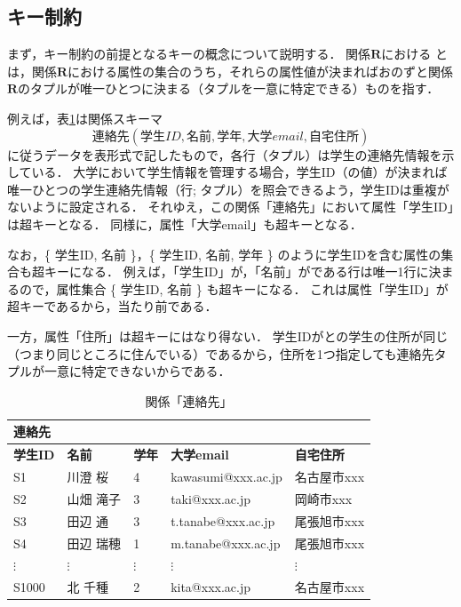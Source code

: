 \subsection{キー制約}
まず，キー制約の前提となるキーの概念について説明する．
関係$\boldsymbol{R}$における とは，関係$\boldsymbol{R}$における属性の集合のうち，それらの属性値が決まればおのずと関係$\boldsymbol{R}$のタプルが唯一ひとつに決まる（タプルを一意に特定できる）ものを指す．

例えば，表\ref{tab:contact-relation}は関係スキーマ
\begin{equation}
連絡先(学生ID, 名前, 学年, 大学email, 自宅住所)
\end{equation}
に従うデータを表形式で記したもので，各行（タプル）は学生の連絡先情報を示している．
大学において学生情報を管理する場合，学生ID（の値）が決まれば唯一ひとつの学生連絡先情報（行; タプル）を照会できるよう，学生IDは重複がないように設定される．
それゆえ，この関係「連絡先」において属性「学生ID」は超キーとなる．
同様に，属性「大学email」も超キーとなる．

なお，\{ 学生ID, 名前 \}，\{ 学生ID, 名前, 学年 \} のように学生IDを含む属性の集合も超キーになる．
例えば，「学生ID」が，「名前」がである行は唯一1行に決まるので，属性集合 \{ 学生ID, 名前 \} も超キーになる．
これは属性「学生ID」が超キーであるから，当たり前である．

一方，属性「住所」は超キーにはなり得ない．
学生IDがとの学生の住所が同じ（つまり同じところに住んでいる）であるから，住所を1つ指定しても連絡先タプルが一意に特定できないからである．


\begin{table}[tb]
\centering
\caption{関係「連絡先」}
\label{tab:contact-relation}
\begin{tabular}{@{}lllll@{}}
連絡先           &             &             &                    &               \\ \midrule
\textbf{学生ID} & \textbf{名前} & \textbf{学年} & \textbf{大学email}   & \textbf{自宅住所} \\ \midrule
S1            & 川澄 桜        & 4           & kawasumi@xxx.ac.jp & 名古屋市xxx       \\
S2            & 山畑 滝子       & 3           & taki@xxx.ac.jp     & 岡崎市xxx        \\
S3            & 田辺 通        & 3           & t.tanabe@xxx.ac.jp & 尾張旭市xxx       \\
S4            & 田辺 瑞穂       & 1           & m.tanabe@xxx.ac.jp & 尾張旭市xxx       \\
$\vdots$      & $\vdots$    & $\vdots$    & $\vdots$           & $\vdots$      \\
S1000         & 北 千種        & 2           & kita@xxx.ac.jp     & 名古屋市xxx       \\ \bottomrule
\end{tabular}
\end{table}


